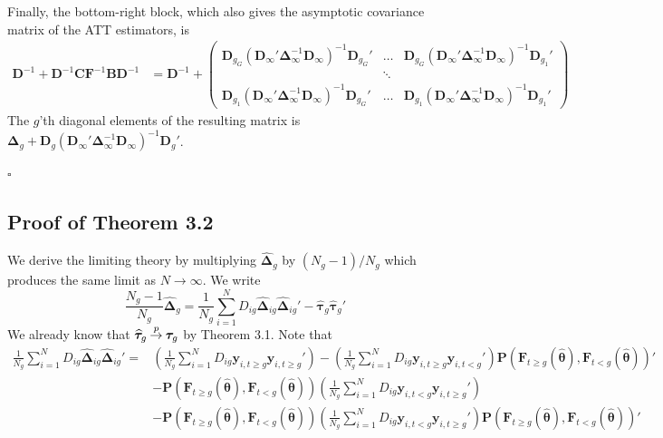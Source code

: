 \documentclass[12pt]{article}
\begin{document}
Finally, the bottom-right block, which also gives the asymptotic covariance matrix of the ATT estimators, is 
\begin{align*}
    \bm D^{-1} + \bm D^{-1} \bm C \bm{F}^{-1} \bm B \bm D^{-1} 
    &= \bm D^{-1} + 
    \begin{pmatrix}
        \bm D_{g_G} (\bm D_{\infty}' \bm \Delta_{\infty}^{-1} \bm D_{\infty})^{-1} \bm D_{g_G}' & \hdots & \bm D_{g_G} (\bm D_{\infty}' \bm \Delta_{\infty}^{-1} \bm D_{\infty})^{-1} \bm D_{g_1}'\\
        & \ddots &\\
        \bm D_{g_1} (\bm D_{\infty}' \bm \Delta_{\infty}^{-1} \bm D_{\infty})^{-1} \bm D_{g_G}' & \hdots & \bm D_{g_1} (\bm D_{\infty}' \bm \Delta_{\infty}^{-1} \bm D_{\infty})^{-1} \bm D_{g_1}'
    \end{pmatrix}
\end{align*}
The $g$'th diagonal elements of the resulting matrix is $\bm \Delta_g + \bm D_g (\bm D_{\infty}' \bm \Delta_{\infty}^{-1} \bm D_{\infty})^{-1} \bm D_g'$.

$\square$




\subsection*{Proof of Theorem 3.2}

We derive the limiting theory by multiplying $\widehat{\bm \Delta}_g$ by $(N_g-1)/N_g$ which produces the same limit as $N \rightarrow \infty$. We write
\begin{equation*}
    \frac{N_g - 1}{ N_g} \widehat{\bm \Delta}_g = \frac{1}{N_g} \sum_{i = 1}^N D_{ig} \widehat{\bm \Delta}_{ig} \widehat{\bm \Delta}_{ig}' - \widehat{\bm \tau}_g \widehat{\bm \tau}_g'
\end{equation*}
We already know that $\widehat{\bm \tau}_g \mathbin{\overset{p}{\to}} \bm \tau_g$ by Theorem 3.1. Note that 
\begin{align*}
    \frac{1}{N_g} \sum_{i = 1}^N D_{ig} \widehat{\bm \Delta}_{ig} \widehat{\bm \Delta}_{ig}' = &\left( \frac{1}{N_g} \sum_{i = 1}^N D_{ig}  \bm y_{i, t \geq g} \bm y_{i, t \geq g}' \right) - \left( \frac{1}{N_g} \sum_{i = 1}^N D_{ig} \bm y_{i, t \geq g} \bm y_{i, t < g}' \right) \bm P(\bm{F}_{t \geq g}(\widehat{\bm{\theta}}), \bm{F}_{t < g}(\widehat{\bm{\theta}}))'\\
    &- \bm P(\bm{F}_{t \geq g}(\widehat{\bm{\theta}}), \bm{F}_{t < g}(\widehat{\bm{\theta}})) \left( \frac{1}{N_g} \sum_{i = 1}^N D_{ig} \bm y_{i, t < g} \bm y_{i, t \geq g}' \right)\\
    &- \bm P(\bm{F}_{t \geq g}(\widehat{\bm{\theta}}), \bm{F}_{t < g}(\widehat{\bm{\theta}})) \left( \frac{1}{N_g} \sum_{i = 1}^N D_{ig}  \bm y_{i, t < g} \bm y_{i, t \geq g}' \right) \bm P(\bm{F}_{t \geq g}(\widehat{\bm{\theta}}), \bm{F}_{t < g}(\widehat{\bm{\theta}}))'
\end{align*} 
\end{document}
